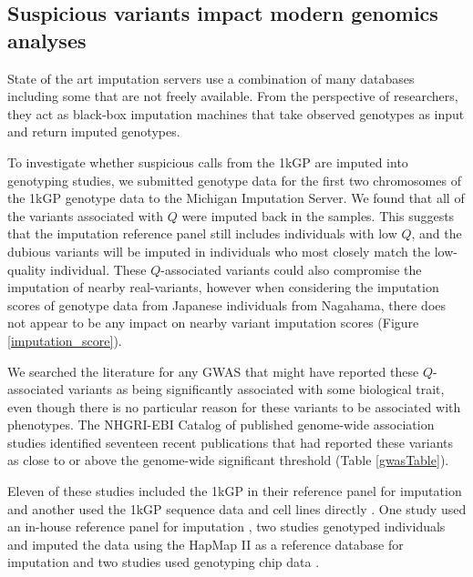\documentclass[9pt,article]{template}
\begin{document}
\subsection{Suspicious variants impact modern genomics analyses}

State of the art imputation servers use a combination of many databases including some that are not freely available.
From the perspective of researchers, they act as black-box imputation machines that take observed genotypes as input and return imputed genotypes.  

To investigate whether suspicious calls from the 1kGP are imputed into genotyping studies, we submitted genotype data for the first two chromosomes of the 1kGP genotype data to the Michigan Imputation Server.
We found that all of the variants associated with $Q$ were imputed back in the samples.
This suggests that the imputation reference panel still includes individuals with low $Q$, and the dubious variants will be imputed in individuals who most closely match the low-quality individual.
These $Q$-associated variants could also compromise the imputation of nearby real-variants, however when considering the imputation scores of genotype data from Japanese individuals from Nagahama, there does not appear to be any impact on nearby variant imputation scores (Figure \ref{imputation_score}).

We searched the literature for any GWAS that might have reported these $Q$-associated variants as being significantly associated with some biological trait, even though there is no particular reason for these variants to be associated with phenotypes.
The NHGRI-EBI Catalog of published genome-wide association studies identified seventeen recent publications that had reported these variants as close to or above the genome-wide significant threshold (Table \ref{gwasTable}).

Eleven of these studies included the 1kGP in their reference panel for imputation \citep{xu2012genome, lutz2015genome, park2015mercapturic, astle2016allelic, herold2016family,  suhre2017connecting, lopez2017genome, tian2017genome,  spracklen2017association,  nagy2017exploration, gao2018genome} and another used the 1kGP sequence data and cell lines directly \citep{Mandage2017}.
One study used an in-house reference panel for imputation \citep{nishida2018key}, two studies genotyped individuals and imputed the data using the HapMap II as a reference  database for imputation \citep{Kraja2011, Ebejer2013} and two studies used genotyping chip data \citep{yucesoy2015genome, ellinghaus2016analysis}. 
\end{document}
